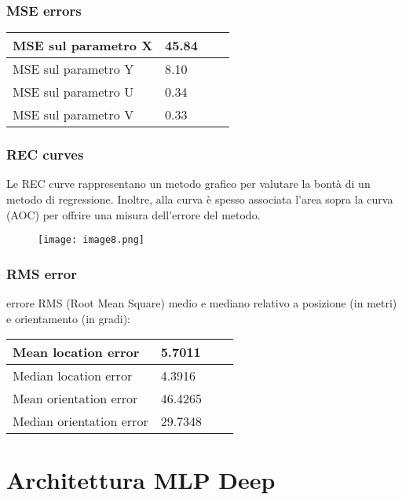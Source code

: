 \subsubsection{MSE errors}
\begin{center}
	\begin{tabular}{| l | l | l | l |}
		\hline
		MSE sul parametro X & 45.84 \\ \hline
		MSE sul parametro Y & 8.10 \\ \hline
		MSE sul parametro U & 0.34 \\ \hline
		MSE sul parametro V & 0.33 \\ \hline							
	\end{tabular}
\end{center}

\subsubsection{REC curves}
Le REC curve rappresentano un metodo grafico per valutare la bontà di un metodo di regressione. Inoltre, alla curva è spesso associata l'area sopra la curva (AOC) per offrire una misura dell'errore del metodo.
\begin{figure}[H]
	\centering
	\texttt{[image: image8.png]}
\end{figure}

\subsubsection{RMS error}
errore RMS (Root Mean Square) medio e mediano relativo a posizione (in metri) e orientamento (in gradi):
\begin{center}
	\begin{tabular}{| l | l | l | l |}
		\hline
		Mean location error & 5.7011 \\ \hline
		Median location error & 4.3916 \\ \hline
		Mean orientation error & 46.4265 \\ \hline
		Median orientation error & 29.7348 \\ \hline							
	\end{tabular}
\end{center}

\newpage

\section{Architettura MLP Deep}

